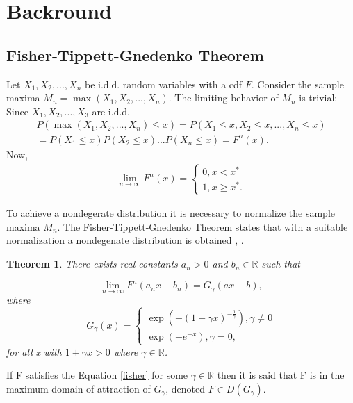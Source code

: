 \documentclass[english,12pt,a4paper,pdftex,sci,utf8]{aaltothesis} %
\newtheorem{theorem}{Theorem}[section]
\begin{document}
\thispagestyle{empty}




\clearpage

\section{Backround}
\label{backround}

\subsection{Fisher-Tippett-Gnedenko Theorem}
\label{domains}

Let $X_1, X_2, ..., X_n$ be i.d.d. random variables with a cdf $F$. Consider the  sample maxima $M_n = \max(X_1, X_2, ..., X_n)$. The limiting behavior of $M_n$ is trivial: Since $X_1, X_2,..., X_3$ are i.d.d.
\begin{gather*}
P(\max(X_1, X_2, ... , X_n) \leq x) = P(X_1 \leq x, X_2 \leq x,..., X_n \leq x) \\ = 
P(X_1 \leq x) P(X_2 \leq x) ... P(X_n \leq x)
=F^n(x).
\end{gather*}
Now,
\begin{gather*}
\lim_{n\to\infty} F^n(x) = 
\begin{cases}
0, x < x^* \\
1, x \geq x^*.
\end{cases}
\end{gather*}



To achieve a nondegerate distribution it is necessary to normalize the sample maxima $M_n$. The Fisher-Tippett-Gnedenko Theorem states that with a suitable normalization a nondegenate distribution is obtained \cite{fisher}, \cite{gnedenko}.

\begin{theorem}
There exists real constants $a_n>0$ and $b_n \in \mathbb{R}$ such that 

\begin{equation}
\lim_{n\to\infty} F^n(a_nx + b_n) = G_{\gamma}(ax+b),
\label{fisher}
\end{equation}
where
\begin{equation*}
G_{\gamma}(x)=
\begin{cases}
\exp(-(1 + \gamma x)^{-\frac{1}{\gamma}}), \gamma \neq 0 \\
\exp(-e^{-x}), \gamma = 0,
\end{cases}
\label{mdaEq}
\end{equation*}
for all x with $1+\gamma x > 0$ where $\gamma \in \mathbb{R}$.
\end{theorem}
If F satisfies the Equation \eqref{fisher} for some $\gamma \in \mathbb{R}$ then it is said that F is in the maximum domain of attraction of $G_{\gamma}$, denoted $F \in D(G_{\gamma})$.
\end{document}
